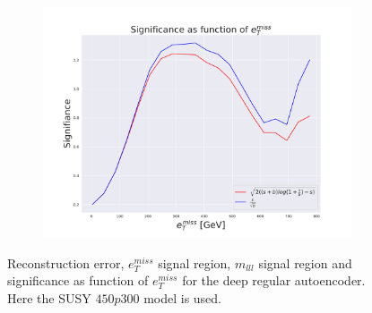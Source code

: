\begin{figure}[H]
    \hfill  
    \begin{subfigure}{.40\textwidth}
        \includegraphics[width=\textwidth]{Figures/AE_testing/small/2lep/significance_etmiss_450p0p0300_-1.287562990021105.pdf}
        \caption{}
        \label{fig:AE_2lep_small_signi_450_2}
    \end{subfigure}
    \hfill      
    \caption[2lep shallow network | $450p300$ | AE | 2]{Reconstruction error, $e_T^{miss}$ signal region, $m_{lll}$ signal region and significance as function of 
    $e_T^{miss}$ for the deep regular autoencoder. Here the SUSY $450p300$ model is used.}
    \label{fig:AE_2lep_small_rec_sig_signi_450_2}
\end{figure}


